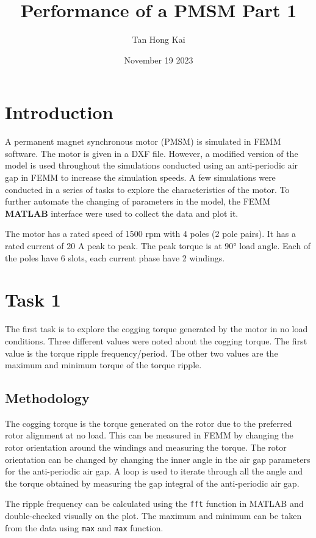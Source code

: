 \documentclass[12pt]{article}
\title{Performance of a PMSM Part 1}
\author{Tan Hong Kai}
\date{November 19 2023}
\begin{document}
\maketitle

\section{Introduction}

A permanent magnet synchronous motor (PMSM) is simulated in FEMM software. The motor is given in a DXF file. However, a modified version of the model is used throughout the simulations conducted using an anti-periodic air gap in FEMM to increase the simulation speeds. A few simulations were conducted in a series of tasks to explore the characteristics of the motor. To further automate the changing of parameters in the model, the FEMM \textbf{MATLAB} interface were used to collect the data and plot it.

The motor has a rated speed of 1500 rpm with 4 poles (2 pole pairs). It has a rated current of $20$ A peak to peak. The peak torque is at $\ang{90}$ load angle. Each of the poles have 6 slots, each current phase have 2 windings. 

\section{Task 1}

The first task is to explore the cogging torque generated by the motor in no load conditions. Three different values were noted about the cogging torque. The first value is the torque ripple frequency/period. The other two values are the maximum and minimum torque of the torque ripple. 

\subsection{Methodology}\label{task-1-method}

The cogging torque is the torque generated on the rotor due to the preferred rotor alignment at no load. This can be measured in FEMM by changing the rotor orientation around the windings and measuring the torque. The rotor orientation can be changed by changing the inner angle in the air gap parameters for the anti-periodic air gap. A loop is used to iterate through all the angle and the torque obtained by measuring the gap integral of the anti-periodic air gap.

The ripple frequency can be calculated using the \lstinline{fft} function in MATLAB and double-checked visually on the plot. The maximum and minimum can be taken from the data using \lstinline{max} and \lstinline{max} function.
\end{document}
